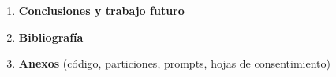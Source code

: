 \documentclass[12pt,a4paper,spanish]{article}
\begin{document}
\begin{enumerate}[leftmargin=2em]
    \begin{enumerate}[label=\arabic*.\arabic*.]
        \item Comparación de modelos
        \item Análisis de errores y sesgos
        \item Limitaciones y amenazas a la validez
    \end{enumerate}
    \item \textbf{Conclusiones y trabajo futuro}
    \item \textbf{Bibliografía}
    \item \textbf{Anexos} (código, particiones, prompts, hojas de consentimiento)
\end{enumerate}

\newpage


\end{document}
